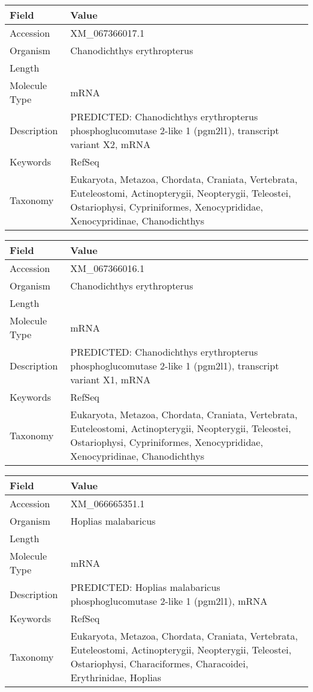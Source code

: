 \documentclass[10pt]{article}
\begin{document}
\vspace{1em}
{\footnotesize
\begin{longtable}{>{\raggedright\arraybackslash}p{4.5cm} >{\raggedright\arraybackslash}p{11.5cm}}
\textbf{Field} & \textbf{Value} \\
\hline
Accession & XM\_067366017.1 \\
Organism & Chanodichthys erythropterus \\
Length & 3199 \\
Molecule Type & mRNA \\
Description & PREDICTED: Chanodichthys erythropterus phosphoglucomutase 2-like 1 (pgm2l1), transcript variant X2, mRNA \\
Keywords & RefSeq \\
Taxonomy & Eukaryota, Metazoa, Chordata, Craniata, Vertebrata, Euteleostomi, Actinopterygii, Neopterygii, Teleostei, Ostariophysi, Cypriniformes, Xenocyprididae, Xenocypridinae, Chanodichthys \\
\end{longtable}
}

\vspace{1em}
{\footnotesize
\begin{longtable}{>{\raggedright\arraybackslash}p{4.5cm} >{\raggedright\arraybackslash}p{11.5cm}}
\textbf{Field} & \textbf{Value} \\
\hline
Accession & XM\_067366016.1 \\
Organism & Chanodichthys erythropterus \\
Length & 3727 \\
Molecule Type & mRNA \\
Description & PREDICTED: Chanodichthys erythropterus phosphoglucomutase 2-like 1 (pgm2l1), transcript variant X1, mRNA \\
Keywords & RefSeq \\
Taxonomy & Eukaryota, Metazoa, Chordata, Craniata, Vertebrata, Euteleostomi, Actinopterygii, Neopterygii, Teleostei, Ostariophysi, Cypriniformes, Xenocyprididae, Xenocypridinae, Chanodichthys \\
\end{longtable}
}

\vspace{1em}
{\footnotesize
\begin{longtable}{>{\raggedright\arraybackslash}p{4.5cm} >{\raggedright\arraybackslash}p{11.5cm}}
\textbf{Field} & \textbf{Value} \\
\hline
Accession & XM\_066665351.1 \\
Organism & Hoplias malabaricus \\
Length & 4621 \\
Molecule Type & mRNA \\
Description & PREDICTED: Hoplias malabaricus phosphoglucomutase 2-like 1 (pgm2l1), mRNA \\
Keywords & RefSeq \\
Taxonomy & Eukaryota, Metazoa, Chordata, Craniata, Vertebrata, Euteleostomi, Actinopterygii, Neopterygii, Teleostei, Ostariophysi, Characiformes, Characoidei, Erythrinidae, Hoplias \\
\end{longtable}
}
\end{document}
